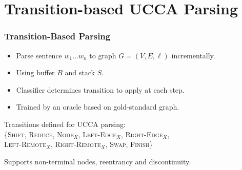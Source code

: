 \documentclass[t]{beamer}
\begin{document}
\section{Transition-based UCCA Parsing}

\begin{frame}
\frametitle{Transition-Based Parsing}
\begin{itemize}
 \item Parse sentence $w_1 \ldots w_n$ to graph $G=(V,E,\ell)$ incrementally.
 \item Using buffer $B$ and stack $S$.
 \item Classifier determines transition to apply at each step.
 \item Trained by an oracle based on gold-standard graph.
\end{itemize}

\begin{center}
\end{center}

\vfill
\pause
Transitions defined for UCCA parsing:\\
\{\textsc{Shift, Reduce, Node$_X$, Left-Edge$_X$, Right-Edge$_X$,}\\
\hspace{5mm}\textsc{Left-Remote$_X$, Right-Remote$_X$, Swap, Finish}\}

\vfill
\pause
Supports non-terminal nodes, reentrancy and discontinuity.
\end{frame}
\end{document}
